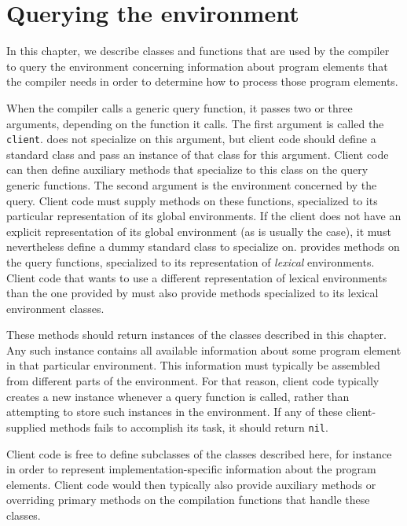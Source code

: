 \chapter{Querying the environment}

\label{chap-environment-querying}

In this chapter, we describe classes and functions that are used by
the compiler to query the environment concerning information about
program elements that the compiler needs in order to determine how to
process those program elements.

When the compiler calls a generic query function, it passes two or
three arguments, depending on the function it calls.  The first
argument is called the \texttt{client}.  \sysname{} does not
specialize on this argument, but client code should define a standard
class and pass an instance of that class for this argument.  Client
code can then define auxiliary methods that specialize to this class
on the query generic functions.  The second argument is the
environment concerned by the query.  Client code must supply methods
on these functions, specialized to its particular representation of
its global environments.  If the client does not have an explicit
representation of its global environment (as is usually the case), it
must nevertheless define a dummy standard class to specialize on.
\sysname{} provides methods on the query functions, specialized to its
representation of \emph{lexical} environments.  Client code that wants
to use a different representation of lexical environments than the one
provided by \sysname{} must also provide methods specialized to its
lexical environment classes.

These methods should return instances of the classes described in this
chapter.  Any such instance contains all available information about
some program element in that particular environment.  This information
must typically be assembled from different parts of the environment.
For that reason, client code typically creates a new instance whenever
a query function is called, rather than attempting to store such
instances in the environment.  If any of these client-supplied methods
fails to accomplish its task, it should return \texttt{nil}.

Client code is free to define subclasses of the classes described
here, for instance in order to represent implementation-specific
information about the program elements.  Client code would then
typically also provide auxiliary methods or overriding primary methods
on the compilation functions that handle these classes.

